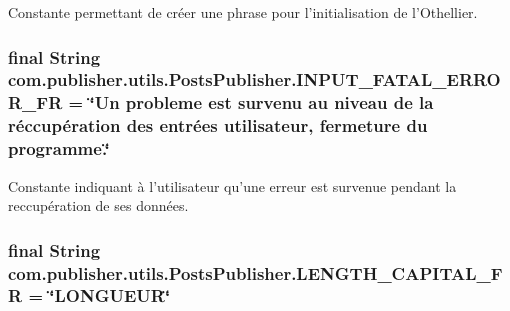 Constante permettant de créer une phrase pour l'initialisation de l'Othellier. \hypertarget{interfacecom_1_1publisher_1_1utils_1_1PostsPublisher_a304b32e5353013f19b84c34dd0506c84}{
\subsubsection[{I\-N\-P\-U\-T\-\_\-\-F\-A\-T\-A\-L\-\_\-\-E\-R\-R\-O\-R\-\_\-\-F\-R}]{\setlength{\rightskip}{0pt plus 5cm}final String com.\-publisher.\-utils.\-Posts\-Publisher.\-I\-N\-P\-U\-T\-\_\-\-F\-A\-T\-A\-L\-\_\-\-E\-R\-R\-O\-R\-\_\-\-F\-R = \char`\"{}Un probleme est survenu au niveau de la réccupération des entrées utilisateur, fermeture du programme.\char`\"{}\hspace{0.3cm}{\ttfamily [static]}}}\label{interfacecom_1_1publisher_1_1utils_1_1PostsPublisher_a304b32e5353013f19b84c34dd0506c84}
Constante indiquant à l'utilisateur qu'une erreur est survenue pendant la reccupération de ses données. \hypertarget{interfacecom_1_1publisher_1_1utils_1_1PostsPublisher_a35181a7f4544547873071e5908cb9ea3}{
\subsubsection[{L\-E\-N\-G\-T\-H\-\_\-\-C\-A\-P\-I\-T\-A\-L\-\_\-\-F\-R}]{\setlength{\rightskip}{0pt plus 5cm}final String com.\-publisher.\-utils.\-Posts\-Publisher.\-L\-E\-N\-G\-T\-H\-\_\-\-C\-A\-P\-I\-T\-A\-L\-\_\-\-F\-R = \char`\"{}L\-O\-N\-G\-U\-E\-U\-R\char`\"{}\hspace{0.3cm}{\ttfamily [static]}}}\label{interfacecom_1_1publisher_1_1utils_1_1PostsPublisher_a35181a7f4544547873071e5908cb9ea3}
